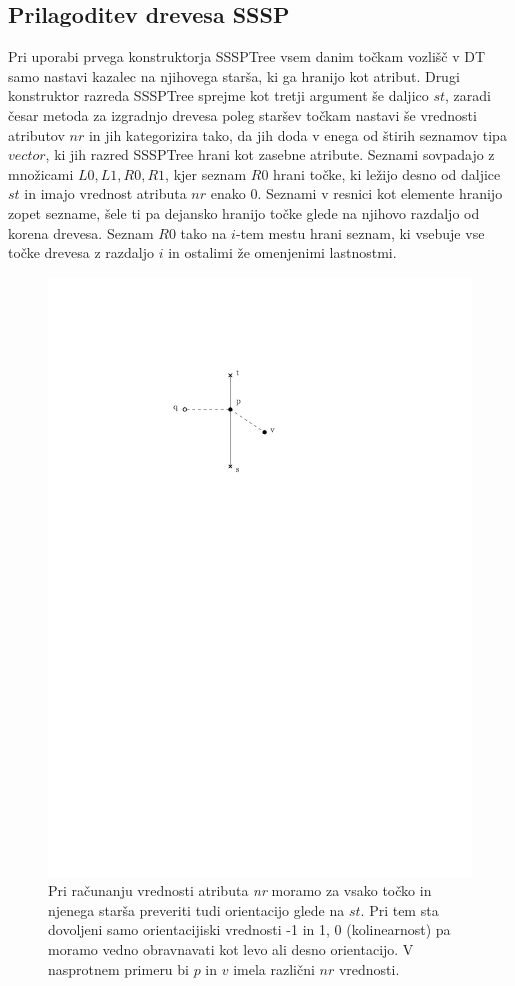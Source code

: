 \documentclass[a4paper, 12pt]{book}
\begin{document}
\subsection{Prilagoditev drevesa SSSP}
Pri uporabi prvega konstruktorja SSSPTree vsem danim točkam vozlišč v DT samo nastavi kazalec na njihovega starša, ki ga hranijo kot atribut. Drugi konstruktor razreda SSSPTree sprejme kot tretji argument še daljico $st$, zaradi česar metoda za izgradnjo drevesa poleg staršev točkam nastavi še vrednosti atributov $nr$ in jih kategorizira tako, da jih doda v enega od štirih seznamov tipa $vector$, ki jih razred SSSPTree hrani kot zasebne atribute. Seznami sovpadajo z množicami $L0, L1, R0, R1$, kjer seznam $R0$ hrani točke, ki ležijo desno od daljice $st$ in imajo vrednost atributa $nr$ enako $0$. Seznami v resnici kot elemente hranijo zopet sezname, šele ti pa dejansko hranijo točke glede na njihovo razdaljo od korena drevesa. Seznam $R0$ tako na $i$-tem mestu  hrani seznam, ki vsebuje vse točke drevesa z razdaljo $i$ in ostalimi že omenjenimi lastnostmi.

\begin{figure}
\centerline{\includegraphics[scale=1]{pics/nrSideExample.pdf}}
\caption{Pri računanju vrednosti atributa \textit{nr} moramo za vsako točko in njenega starša preveriti tudi orientacijo glede na $st$. Pri tem sta dovoljeni samo orientacijiski vrednosti -1 in 1, 0 (kolinearnost) pa moramo vedno obravnavati kot levo ali desno orientacijo. V nasprotnem primeru bi $p$ in $v$ imela različni $nr$ vrednosti.}
\label{pq-left-right}
\end{figure}
\end{document}
